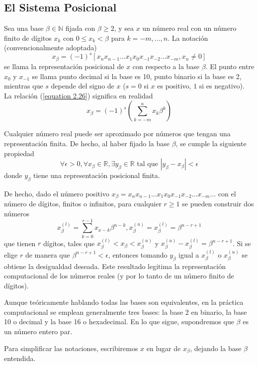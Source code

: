\subsection{El Sistema Posicional}
Sea una base $\beta \in \mathbb{N}$ fijada con $\beta \geq 2$, y sea $x$ un número real con un número finito de dígitos $x_k$ con $0 \leq x_k < \beta$ para $k = -m,...,n$. La notación (convencionalmente adoptada)
\begin{equation}
    x_\beta = (-1)^s [x_n x_{n-1}...x_1x_0x_{-1}x_{-2}...x_{-m}, x_n \neq 0]
    \label{equation 2.26}
\end{equation}
se llama la representación posicional de $x$ con respecto a la base $\beta$. El punto entre $x_0$ y $x_{-1}$ se llama punto decimal si la base es 10, punto binario si la base es 2, mientras que $s$ depende del signo de $x$ ($s=0$ si $x$ es positivo, $1$ si es negativo). La relación (\ref{equation 2.26}) significa en realidad
\[ x_\beta = (-1)^s \left( \sum_{k=-m}^{n} x_k \beta^k \right)\]

Cualquier número real puede ser aproximado por números que tengan una representación finita. De hecho, al haber fijado la base $\beta$, se cumple la siguiente propiedad
\[ \forall \epsilon > 0, \forall x_\beta \in \mathbb{R}, \exists y_\beta \in \mathbb{R} \text{ tal que } |y_\beta - x_\beta| < \epsilon\]
donde $y_\beta$ tiene una representación posicional finita.

De hecho, dado el número positivo $x_\beta = x_n x_{n-1}...x_1x_0x_{-1}x_{-2}...x_{-m}...$ con el número de dígitos, finitos o infinitos, para cualquier $r \geq 1$ se pueden construir dos números
\[x_\beta^{(l)} = \sum_{k = 0}^{r-1} x_{x-k} \beta^{n-k}, x_\beta^{(u)} = x_\beta^{(l)} = \beta^{n-r+1}\]
que tienen $r$ dígitos, tales que $x_\beta^{(l)} < x_\beta < x_\beta^{(u)}$ y $x_\beta^{(u)} - x_\beta^{(l)} = \beta^{n-r+1}$. Si se elige $r$ de manera que $\beta^{n-r+1} < \epsilon$, entonces tomando $y_\beta$ igual a $x_\beta^{(l)}$ o $x_\beta^{(u)}$ se obtiene la desigualdad deseada. Este resultado legitima la representación computacional de los números reales (y por lo tanto de un número finito de dígitos).

Aunque teóricamente hablando todas las bases son equivalentes, en la práctica computacional se emplean generalmente tres bases: la base 2 en binario, la base 10 o decimal y la base 16 o hexadecimal. En lo que sigue, supondremos que $\beta$ es un número entero par.

Para simplificar las notaciones, escribiremos $x$ en lugar de $x_\beta$, dejando la base $\beta$ entendida.


